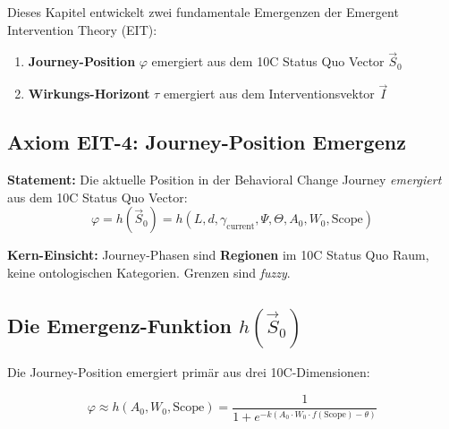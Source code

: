 Dieses Kapitel entwickelt zwei fundamentale Emergenzen der Emergent Intervention Theory (EIT):

\begin{enumerate}
\item \textbf{Journey-Position} $\varphi$ emergiert aus dem 10C Status Quo Vector $\vec{S}_0$
\item \textbf{Wirkungs-Horizont} $\tau$ emergiert aus dem Interventionsvektor $\vec{I}$
\end{enumerate}

\subsection{Axiom EIT-4: Journey-Position Emergenz}

\begin{tcolorbox}[colback=blue!5!white, colframe=blue!75!black,
    title=\textbf{Axiom EIT-4: Journey-Position als emergente Eigenschaft (aus Appendix HHH)}]

\textbf{Statement:} Die aktuelle Position in der Behavioral Change Journey \textit{emergiert} aus dem 10C Status Quo Vector:
\begin{equation}
\boxed{\varphi = h(\vec{S}_0) = h(L, d, \gamma_{\text{current}}, \Psi, \Theta, A_0, W_0, \text{Scope})}
\label{eq:18-journey-emergence}
\end{equation}

\textbf{Kern-Einsicht:} Journey-Phasen sind \textbf{Regionen} im 10C Status Quo Raum, keine ontologischen Kategorien. Grenzen sind \textit{fuzzy}.

\end{tcolorbox}

\subsection{Die Emergenz-Funktion $h(\vec{S}_0)$}

Die Journey-Position emergiert primär aus drei 10C-Dimensionen:

\begin{equation}
\varphi \approx h(A_0, W_0, \text{Scope}) = \frac{1}{1 + e^{-k(A_0 \cdot W_0 \cdot f(\text{Scope}) - \theta)}}
\label{eq:18-emergence-function}
\end{equation}


